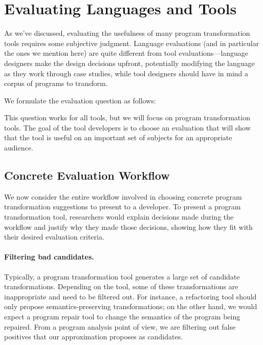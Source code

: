 \section{Evaluating Languages and Tools}
\label{sec:how-to-evaluate}
As we've discussed, evaluating the usefulness of many program
transformation tools requires some subjective judgment. 
Language evaluations (and in particular the ones we mention here) are
quite different from tool evaluations---language designers make
the design decisions upfront, potentially modifying the language
as they work through case studies, while tool designers should have
in mind a corpus of programs to transform.

We formulate the evaluation question as follows:
\begin{center}
\end{center}
This question works for all tools, but we will focus on program
transformation tools. The goal of the tool developers is to choose
an evaluation that will show that the tool is useful on an important
set of subjects for an appropriate audience.

\subsection{Concrete Evaluation Workflow}
We now consider the entire workflow involved in choosing concrete
program transformation suggestions to present to a developer. To present
a program transformation tool, researchers would explain decisions made during
the workflow and justify why they made those decisions, showing how they fit
with their
desired evaluation criteria.

\paragraph{Filtering bad candidates.} Typically, a
program transformation tool generates a large set of candidate
transformations. Depending on the tool, some of these transformations
are inappropriate and need to be filtered out. For instance, a
refactoring tool should only propose semantics-preserving
transformations; on the other hand, we would expect a program repair
tool to change the semantics of the program being repaired.
From a program analysis point of view, we are filtering out false
positives that our approximation proposes as candidates.

